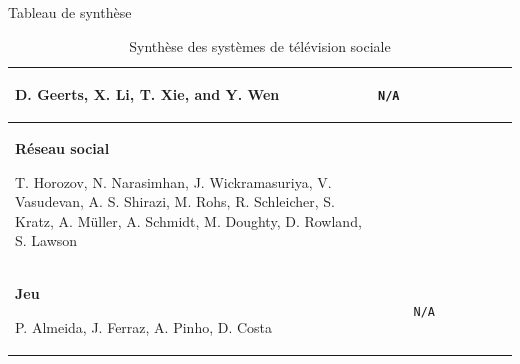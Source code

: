 \documentclass{beamer}
\newcommand{\xmark}{\ding{55}}%
\newcommand{\cmark}{\ding{51}}%
\begin{document}
\begin{frame}{\hspace{10px}Tableau de synthèse}
\begin{table}[H]
\begin{tabular}{|p{1.4cm}|p{1.45cm}|p{0.7cm}|p{0.6cm}|p{0.6cm}|p{0.25cm}|p{1.1cm}|p{0.6cm}|}
\begin{minipage}{1.4cm}
\begin{flushleft}
			D. Geerts, X. Li, T. Xie, and Y. Wen
		\end{flushleft}
			\end{minipage}
			\vspace{2px}
			& \texttt{N/A}&\xmark&\cmark&\xmark&\cmark&\xmark& \cmark\\
			\hline
			\begin{minipage}{1.4cm}
				\vspace{0.5px}
				\textbf{Réseau social}\newline
			\vspace{-12px}
			\begin{flushleft}
			\fontsize{4}{4}\selectfont
			T. Horozov, N. Narasimhan, J. Wickramasuriya, V. Vasudevan, A. S. Shirazi, M. Rohs, R. Schleicher, S. Kratz,
			A. Müller, A. Schmidt, M. Doughty, D. Rowland, S. Lawson
		\end{flushleft}
			\end{minipage}
			\vspace{2px}
			&\cmark&\cmark&\cmark&\cmark&\cmark&\cmark& \cmark \\
			\hline
			\begin{minipage}{1.4cm}
				\vspace{0.5px}
				\textbf{Jeu}\newline
			\vspace{-12px}
			\begin{flushleft}
			\fontsize{4}{4}\selectfont
			P. Almeida, J. Ferraz, A. Pinho, D. Costa
		\end{flushleft}
			\end{minipage}
			\vspace{2px}
			&\xmark& \texttt{N/A} &\cmark&\cmark&\cmark&\xmark& \cmark\\
			\hline
		\end{tabular}
		\caption{Synthèse des systèmes de télévision sociale\footnotemark[1]}
	\end{table}
	\end{frame}
\end{document}
